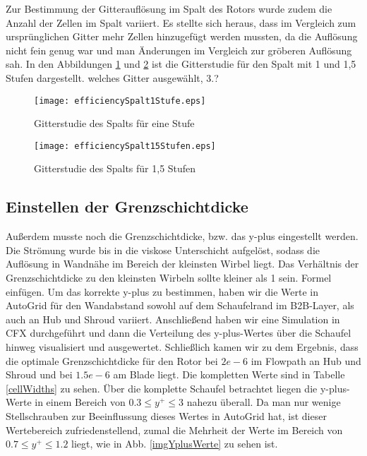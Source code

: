 Zur Bestimmung der Gitterauflösung im Spalt des Rotors wurde zudem die Anzahl der Zellen im Spalt variiert. Es stellte sich heraus, dass im Vergleich zum ursprünglichen Gitter mehr Zellen hinzugefügt werden mussten, da die Auflösung nicht fein genug war und man Änderungen im Vergleich zur gröberen Auflösung sah.  In den Abbildungen \ref{effSpalt1} und \ref{effSpalt15} ist die Gitterstudie für den Spalt mit 1 und 1,5 Stufen dargestellt. \todo welches Gitter ausgewählt, 3.?


\begin{figure}[htbp]
	\centering
	\label{effSpalt1}
	\texttt{[image: efficiencySpalt1Stufe.eps]}
	\caption{Gitterstudie des Spalts für eine Stufe}
\end{figure}

\begin{figure}[htbp]
	\centering
	\label{effSpalt15}
	\texttt{[image: efficiencySpalt15Stufen.eps]}
	\caption{Gitterstudie des Spalts für 1,5 Stufen}
\end{figure}

\subsection{Einstellen der Grenzschichtdicke}
Außerdem musste noch die Grenzschichtdicke, bzw. das y-plus eingestellt werden. Die Strömung wurde bis in die viskose Unterschicht aufgelöst, sodass die Auflösung in Wandnähe im Bereich der kleinsten Wirbel liegt. Das Verhältnis der Grenzschichtdicke zu den kleinsten Wirbeln sollte kleiner als 1 sein. \todo Formel einfügen. Um das korrekte y-plus zu bestimmen, haben wir die Werte in AutoGrid für den Wandabstand sowohl auf dem Schaufelrand im B2B-Layer, als auch an Hub und Shroud variiert.  Anschließend haben wir eine Simulation in CFX durchgeführt und dann die Verteilung des y-plus-Wertes über die Schaufel hinweg visualisiert und ausgewertet. Schließlich kamen wir zu dem Ergebnis, dass die optimale Grenzschichtdicke für den Rotor bei $2e-6$ im Flowpath an Hub und Shroud und bei $1.5e-6$ am Blade liegt. Die kompletten Werte sind in Tabelle \ref{cellWidths} zu sehen. Über die komplette Schaufel betrachtet liegen die y-plus-Werte in einem Bereich von $0.3 \leq y^+ \leq 3$ nahezu überall. Da man nur wenige Stellschrauben zur Beeinflussung dieses Wertes in AutoGrid hat, ist dieser Wertebereich zufriedenstellend, zumal die Mehrheit der Werte im Bereich von $0.7 \leq y^+ \leq 1.2$  liegt, wie in Abb. \ref{imgYplusWerte} zu sehen ist. 

